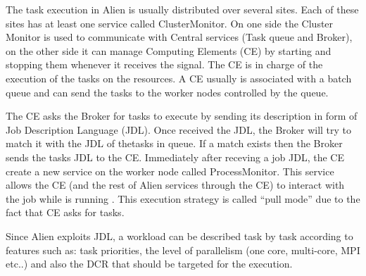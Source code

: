 

The task execution in Alien is usually distributed over several sites. Each of these sites has at least one service called ClusterMonitor. On one side the Cluster Monitor is used to communicate with Central services (Task queue and Broker), on the other side it can manage Computing Elements (CE) by starting and stopping them whenever it receives the signal.
The CE is in charge of the execution of the tasks on the resources. A CE usually is associated with a batch queue and can send the tasks to the worker nodes controlled by the queue.

The CE asks the Broker for tasks to execute by sending its description in form of Job Description Language (JDL).
Once received the JDL, the Broker will try to match it with the JDL of thetasks in queue. If a match exists then the Broker sends the tasks JDL to the CE.
Immediately after receving a job JDL, the CE create a new service on the worker node called ProcessMonitor. This service allows the CE (and the rest of Alien services through the CE) to interact with the job while is running \cite{Saiz2003}. 
This execution strategy is called ``pull mode'' due to the fact that CE asks for tasks.

Since Alien exploits JDL, a  workload can be described task by task according to features such as: task priorities, the level of parallelism (one core, multi-core, MPI etc..) and  also the DCR that should be targeted for the execution.


